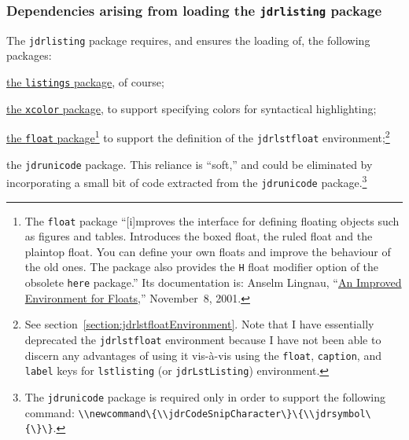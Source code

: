 \documentclass[12pt,table,final]{article}%
\newcommand{\floatPackageDocsLocation}{Anselm Lingnau, ``\href{http://mirrors.ctan.org/macros/latex/contrib/float/float.pdf}{An Improved Environment for Floats},'' November~8, 2001}
\begin{document}
\subsubsection{Dependencies arising from loading the \lstinline|jdrlisting| package} 
The \lstinline|jdrlisting| package requires, and ensures the loading of, the following packages:
\begin{jdr_itemize}
  \item \href{https://ctan.org/pkg/listings?lang=en}{the \lstinline|listings| package}, of course;
  \item \href{https://ctan.org/pkg/xcolor}{the \lstinline|xcolor| package}, to support specifying colors for syntactical highlighting;
  \item \href{https://ctan.org/pkg/float?lang=en}{the \lstinline|float| package}\footnote{The \lstinline|float| package ``[i]mproves the interface for defining floating objects such as figures and tables. Introduces the boxed float, the ruled float and the plaintop float. You can define your own floats and improve the behaviour of the old ones. The package also provides the \lstinline|H| float modifier option of the obsolete \lstinline|here| package.'' Its documentation is: \floatPackageDocsLocation.} to support the definition of the \lstinline|jdrlstfloat| environment;\footnote{See section~\ref{section:jdrlstfloatEnvironment}. Note that I have essentially deprecated the \lstinline|jdrlstfloat| environment because I have not been able to discern any advantages of using it vis-à-vis using the \lstinline|float|, \lstinline|caption|, and \lstinline|label| keys for \lstinline|lstlisting| (or \lstinline|jdrLstListing|) environment.}
  \item the \lstinline$jdrunicode$ package. This reliance is ``soft,'' and could be eliminated by incorporating a small bit of code extracted from the \lstinline|jdrunicode| package.\footnote{The \lstinline|jdrunicode| package is required only in order to support the following command: \mbox{\lstinline|\\newcommand\{\\jdrCodeSnipCharacter\}\{\\jdrsymbol\{|\lstinline|\}\}|.}}
\end{jdr_itemize}
\end{document}
